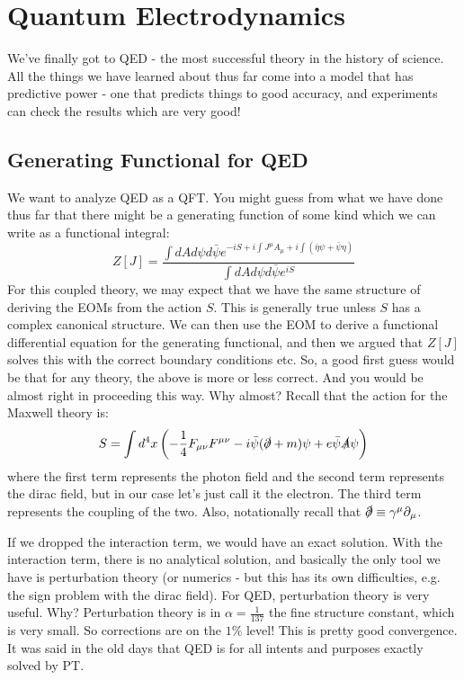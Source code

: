 \section{Quantum Electrodynamics}
We've finally got to QED - the most successful theory in the history of science. All the things we have learned about thus far come into a model that has predictive power - one that predicts things to good accuracy, and experiments can check the results which are very good!

\subsection{Generating Functional for QED}

We want to analyze QED as a QFT. You might guess from what we have done thus far that there might be a generating function of some kind which we can write as a functional integral:
\begin{equation}
    Z[J] = \frac{\int dA d\psi d\bar{\psi} e^{-iS + i \int J^\mu A_\mu + i\int (\bar{\eta}\psi + \bar{\psi}\eta)}}{\int dA d\psi d\bar{\psi}e^{iS}}
\end{equation}
For this coupled theory, we may expect that we have the same structure of deriving the EOMs from the action $S$. This is generally true unless $S$ has a complex canonical structure. We can then use the EOM to derive a functional differential equation for the generating functional, and then we argued that $Z[J]$ solves this with the correct boundary conditions etc. So, a good first guess would be that for any theory, the above is more or less correct. And you would be almost right in proceeding this way. Why almost? Recall that the action for the Maxwell theory is:
\begin{equation}
    S = \int d^4x \left(-\frac{1}{4}F_{\mu\nu}F^{\mu\nu} - i\bar{\psi}(\slashed{\partial} + m)\psi + e\bar{\psi}\slashed{A}\psi \right)
\end{equation}
where the first term represents the photon field and the second term represents the dirac field, but in our case let's just call it the electron. The third term represents the coupling of the two. Also, notationally recall that $\slashed{\partial} \equiv \gamma^\mu \partial_\mu$. 

If we dropped the interaction term, we would have an exact solution. With the interaction term, there is no analytical solution, and basically the only tool we have is perturbation theory (or numerics - but this has its own difficulties, e.g. the sign problem with the dirac field). For QED, perturbation theory is very useful. Why? Perturbation theory is in $\alpha = \frac{1}{137}$ the fine structure constant, which is very small. So corrections are on the $1\%$ level! This is pretty good convergence. It was said in the old days that QED is for all intents and purposes exactly solved by PT. 


